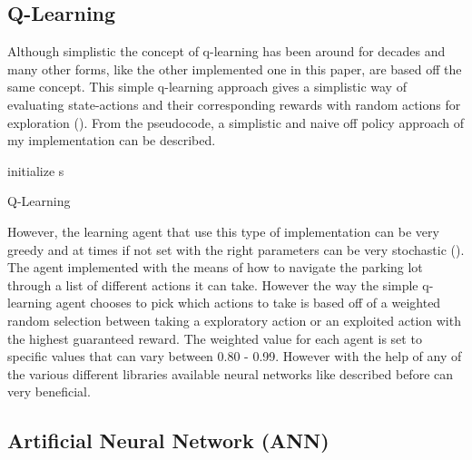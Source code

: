 \documentclass[letterpaper]{article}
\begin{document}
\subsection{Q-Learning}

Although simplistic the concept of q-learning has been around for decades and many other forms, like the other implemented one in this paper, are based off the same concept. This simple q-learning approach gives a simplistic way of evaluating state-actions and their corresponding rewards with random actions for exploration (\cite{watkins1992q}). From the pseudocode, a simplistic and naive off policy approach of my implementation can be described.
\begin{algorithm}[h]
  initialize s\;
 \caption{Q-Learning}
\end{algorithm}

However, the learning agent that use this type of implementation can be very greedy and at times if not set with the right parameters can be very stochastic (\cite{sutton2018reinforcement}).  The agent implemented with the means of how to navigate the parking lot through a list of different actions it can take.  However the way the simple q-learning agent chooses to pick which actions to take is based off of a weighted random selection between taking a exploratory action or an exploited action with the highest guaranteed reward. The weighted value for each agent is set to specific values that can vary between 0.80 - 0.99.  However with the help of any of the various different libraries available neural networks like described before can very beneficial. 


\subsection{Artificial Neural Network (ANN) }
\end{document}
